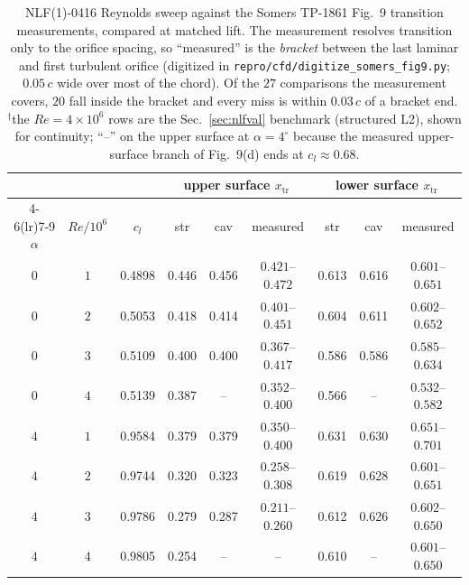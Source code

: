 \begin{table}[tp]
  \centering\small
  \caption{NLF(1)-0416 Reynolds sweep against the Somers TP-1861 Fig.~9 transition measurements, compared at matched lift. The measurement resolves transition only to the orifice spacing, so ``measured'' is the \emph{bracket} between the last laminar and first turbulent orifice (digitized in \texttt{repro/cfd/digitize\_somers\_fig9.py}; $0.05\,c$ wide over most of the chord). Of the $27$ comparisons the measurement covers, $20$ fall inside the bracket and every miss is within $0.03\,c$ of a bracket end. $^\dagger$the $Re\!=\!4\!\times\!10^6$ rows are the Sec.~\ref{sec:nlfval} benchmark (structured L2), shown for continuity; ``--'' on the upper surface at $\alpha\!=\!4^\circ$ because the measured upper-surface branch of Fig.~9(d) ends at $c_l\!\approx\!0.68$.}
  \label{tab:extnlfsomers}
  \begin{tabular}{cc c ccc ccc}
    \toprule
    & & & \multicolumn{3}{c}{upper surface $x_\mathrm{tr}$} & \multicolumn{3}{c}{lower surface $x_\mathrm{tr}$} \\
    \cmidrule(lr){4-6}\cmidrule(lr){7-9}
    $\alpha$ & $Re/10^6$ & $c_l$ & str & cav & measured & str & cav & measured \\
    \midrule
    $0$ & $1$ & 0.4898 & 0.446 & 0.456 & $0.421$--$0.472$ & 0.613 & 0.616 & $0.601$--$0.651$ \\
    $0$ & $2$ & 0.5053 & 0.418 & 0.414 & $0.401$--$0.451$ & 0.604 & 0.611 & $0.602$--$0.652$ \\
    $0$ & $3$ & 0.5109 & 0.400 & 0.400 & $0.367$--$0.417$ & 0.586 & 0.586 & $0.585$--$0.634$ \\
    $0$ & $4$\rlap{$^\dagger$} & 0.5139 & 0.387 & -- & $0.352$--$0.400$ & 0.566 & -- & $0.532$--$0.582$ \\
    $4$ & $1$ & 0.9584 & 0.379 & 0.379 & $0.350$--$0.400$ & 0.631 & 0.630 & $0.651$--$0.701$ \\
    $4$ & $2$ & 0.9744 & 0.320 & 0.323 & $0.258$--$0.308$ & 0.619 & 0.628 & $0.601$--$0.651$ \\
    $4$ & $3$ & 0.9786 & 0.279 & 0.287 & $0.211$--$0.260$ & 0.612 & 0.626 & $0.602$--$0.650$ \\
    $4$ & $4$\rlap{$^\dagger$} & 0.9805 & 0.254 & -- & -- & 0.610 & -- & $0.601$--$0.650$ \\
    \bottomrule
  \end{tabular}
\end{table}

